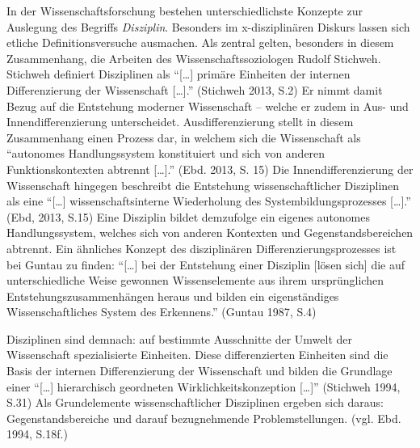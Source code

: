 \documentclass[a4paper,
fontsize=11pt,
oneside,
numbers=noperiodatend,
parskip=half-,
bibliography=totoc,
final
]{scrartcl}
\begin{document}
In der Wissenschaftsforschung bestehen unterschiedlichste Konzepte zur
Auslegung des Begriffs \emph{Disziplin}. Besonders im x-disziplinären
Diskurs lassen sich etliche Definitionsversuche ausmachen. Als zentral
gelten, besonders in diesem Zusammenhang, die Arbeiten des
Wissenschaftssoziologen Rudolf Stichweh. Stichweh definiert Disziplinen
als \enquote{{[}\ldots{}{]} primäre Einheiten der internen
Differenzierung der Wissenschaft {[}\ldots{}{]}.} (Stichweh 2013, S.2)
Er nimmt damit Bezug auf die Entstehung moderner Wissenschaft -- welche
er zudem in Aus- und Innendifferenzierung unterscheidet.
Ausdifferenzierung stellt in diesem Zusammenhang einen Prozess dar, in
welchem sich die Wissenschaft als \enquote{autonomes Handlungssystem
konstituiert und sich von anderen Funktionskontexten abtrennt
{[}\ldots{}{]}.} (Ebd. 2013, S. 15) Die Innendifferenzierung der
Wissenschaft hingegen beschreibt die Entstehung wissenschaftlicher
Disziplinen als eine \enquote{{[}\ldots{}{]} wissenschaftsinterne
Wiederholung des Systembildungsprozesses {[}\ldots{}{]}.} (Ebd, 2013,
S.15) Eine Disziplin bildet demzufolge ein eigenes autonomes
Handlungssystem, welches sich von anderen Kontexten und
Gegenstandsbereichen abtrennt. Ein ähnliches Konzept des disziplinären
Differenzierungsprozesses ist bei Guntau zu finden:
\enquote{{[}\ldots{}{]} bei der Entstehung einer Disziplin {[}lösen
sich{]} die auf unterschiedliche Weise gewonnen Wissenselemente aus
ihrem ursprünglichen Entstehungszusammenhängen heraus und bilden ein
eigenständiges Wissenschaftliches System des Erkennens.} (Guntau 1987,
S.4)

Disziplinen sind demnach: auf bestimmte Ausschnitte der Umwelt der
Wissenschaft spezialisierte Einheiten. Diese differenzierten Einheiten
sind die Basis der internen Differenzierung der Wissenschaft und bilden
die Grundlage einer \enquote{{[}\ldots{}{]} hierarchisch geordneten
Wirklichkeitskonzeption {[}\ldots{}{]}} (Stichweh 1994, S.31) Als
Grundelemente wissenschaftlicher Disziplinen ergeben sich daraus:
Gegenstandsbereiche und darauf bezugnehmende Problemstellungen. (vgl.
Ebd. 1994, S.18f.)
\end{document}
